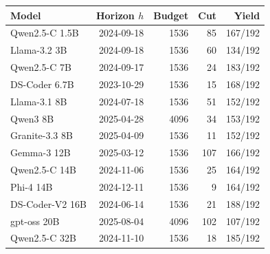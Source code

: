\begin{tabular}{@{}lrrrr@{}}
\toprule
Model & Horizon $h$ & Budget & Cut & Yield \\
\midrule
Qwen2.5-C 1.5B & 2024-09-18 & 1536 & 85 & 167/192 \\
Llama-3.2 3B & 2024-09-18 & 1536 & 60 & 134/192 \\
Qwen2.5-C 7B & 2024-09-17 & 1536 & 24 & 183/192 \\
DS-Coder 6.7B & 2023-10-29 & 1536 & 15 & 168/192 \\
Llama-3.1 8B & 2024-07-18 & 1536 & 51 & 152/192 \\
Qwen3 8B & 2025-04-28 & 4096 & 34 & 153/192 \\
Granite-3.3 8B & 2025-04-09 & 1536 & 11 & 152/192 \\
Gemma-3 12B & 2025-03-12 & 1536 & 107 & 166/192 \\
Qwen2.5-C 14B & 2024-11-06 & 1536 & 25 & 164/192 \\
Phi-4 14B & 2024-12-11 & 1536 & 9 & 164/192 \\
DS-Coder-V2 16B & 2024-06-14 & 1536 & 21 & 188/192 \\
gpt-oss 20B & 2025-08-04 & 4096 & 102 & 107/192 \\
Qwen2.5-C 32B & 2024-11-10 & 1536 & 18 & 185/192 \\
\bottomrule
\end{tabular}
